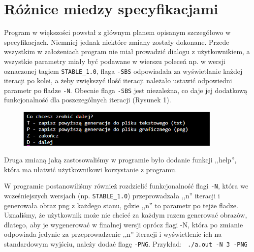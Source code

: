 \documentclass{article}
\begin{document}
\section{Różnice miedzy specyfikacjami}
{\fontsize{14}{14}\selectfont

Program w większości powstał z głównym planem opisanym szczegółowo w specyfikacjach.
\newline
\newline
Niemniej jednak niektóre zmiany zostały dokonane. Przede wszystkim w założeniach program nie miał prowadzić dialogu z użytkownikiem, a wszystkie parametry miały być podawane w wierszu poleceń np. w wersji oznaczonej tagiem \texttt{STABLE\_1.0}, flaga \texttt{-SBS} odpowiadała za wyświetlanie każdej iteracji po kolei, a żeby zwiększyć ilość iteracji należało ustawić odpowiedni parametr po fladze \texttt{-N}. Obecnie flaga \texttt{-SBS} jest niezależna, co daje jej dodatkową funkcjonalność dla poszczególnych iteracji (Rysunek 1).

\begin{figure}[h]
\centering
\includegraphics[width=10cm]{sbs.png}
\caption{}
\label{fig:obrazek }
\end{figure}


Druga zmianą jaką zastosowaliśmy w programie było dodanie funkcji ,,help'', która ma ułatwić użytkownikowi korzystanie z programu.


W programie postanowiliśmy również rozdzielić funkcjonalność flagi \texttt{-N}, która we wcześniejszych wersjach (np. \texttt{STABLE\_1.0}) przeprowadzała ,,n'' iteracji i generowała obraz png z każdego stanu, gdzie ,,n'' to parametr po tejże fladze. Uznaliśmy, że użytkownik może nie chcieć za każdym razem generować obrazów, dlatego, aby je wygenerować w finalnej wersji oprócz flagi -N, która po zmianie odpowiada jedynie za przeprowadzenie ,,n'' iteracji i wyświetlenie ich na standardowym wyjściu, należy dodać flagę \texttt{-PNG}.
Przykład: \texttt{ ./a.out -N 3 -PNG }



}

\end{document}
